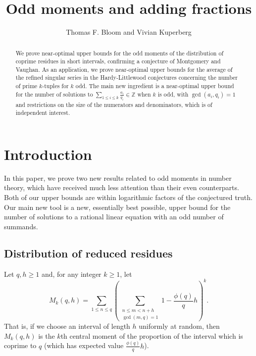 \documentclass[11pt,letterpaper]{amsart}
\title{Odd moments and adding fractions}
\author{Thomas F. Bloom and Vivian Kuperberg}
\newcommand{\brac}[1]{\left( #1\right)}
\newcommand{\ogcd}[2]{\gcd(#1,#2)}
\theoremstyle{definition}
\begin{document}
 \begin{abstract}
We prove near-optimal upper bounds for the odd moments of the distribution of coprime residues in short intervals, confirming a conjecture of Montgomery and Vaughan. As an application, we prove near-optimal upper bounds for the average of the refined singular series in the Hardy-Littlewood conjectures concerning the number of prime $k$-tuples for $k$ odd. The main new ingredient is a near-optimal upper bound for the number of solutions to $\sum_{1\leq i\leq k}\tfrac{a_i}{q_i}\in \mathbb{Z}$ when $k$ is odd, with $\ogcd{a_i}{q_i}=1$ and restrictions on the size of the numerators and denominators, which is of independent interest.
 \end{abstract}
\maketitle

\section{Introduction}
In this paper, we prove two new results related to odd moments in number theory, which have received much less attention than their even counterparts. Both of our upper bounds are within logarithmic factors of the conjectured truth. Our main new tool is a new, essentially best possible, upper bound for the number of solutions to a rational linear equation with an odd number of summands.

\subsection{Distribution of reduced residues}
Let $q,h\geq 1$ and, for any integer $k\geq 1$, let
\[M_k(q,h) = \sum_{1\leq n\leq q}\brac{\sum_{\substack{n\leq m < n+h\\ \ogcd{m}{q}=1}}1-\frac{\phi(q)}{q}h}^k.\]
That is, if we choose an interval of length $h$ uniformly at random, then $M_k(q,h)$ is the $k$th central moment of the proportion of the interval which is coprime to $q$ (which has expected value $\tfrac{\phi(q)}{q}h$).
\end{document}
